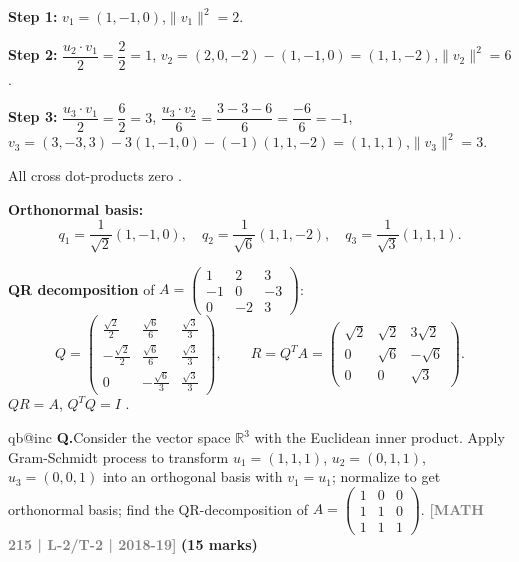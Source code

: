 \documentclass[12pt,a3paper]{article}
\makeatletter
\newcommand{\yr}[1]{\hfill\textcolor{gray}{\small\textbf{[#1]}}}
\newcommand{\mk}[1]{\textcolor{orange!70!black}{\small\textbf{(#1 marks)}}}
\newcounter{qnum}
\newcommand{\Q}[1]{%
  \csname qb@inc\endcsname
  \needspace{4\baselineskip}
  \refstepcounter{qnum}
  \vspace{6pt}
  \noindent\textbf{Q\theqnum.}\enspace #1\par
}
\makeatother
\begin{document}
\begin{tcolorbox}[enhanced,breakable,
  colback=cD!4,colframe=cD,boxrule=0.8pt,arc=5pt,
  title={\textbf{Answer --- Gram-Schmidt \& QR: $u_1\!=\!(1,-1,0)$, $u_2\!=\!(2,0,-2)$, $u_3\!=\!(3,-3,3)$}},
  fonttitle=\bfseries\color{white},colbacktitle=cD]

\textbf{Step 1:} $v_1=(1,-1,0)$,\quad $\|v_1\|^2=2$.

\textbf{Step 2:} $\dfrac{u_2\cdot v_1}{2}=\dfrac{2}{2}=1$,\quad
$v_2=(2,0,-2)-(1,-1,0)=(1,1,-2)$,\quad $\|v_2\|^2=6$.

\textbf{Step 3:} $\dfrac{u_3\cdot v_1}{2}=\dfrac{6}{2}=3$,\;
$\dfrac{u_3\cdot v_2}{6}=\dfrac{3-3-6}{6}=\dfrac{-6}{6}=-1$,\quad
$v_3=(3,-3,3)-3(1,-1,0)-(-1)(1,1,-2)=(1,1,1)$,\quad $\|v_3\|^2=3$.

All cross dot-products zero . \checkmark

\textbf{Orthonormal basis:}
\[
q_1=\frac{1}{\sqrt{2}}(1,-1,0),\quad
q_2=\frac{1}{\sqrt{6}}(1,1,-2),\quad
q_3=\frac{1}{\sqrt{3}}(1,1,1).
\]

\textbf{QR decomposition} of $A=\begin{pmatrix}1&2&3\\-1&0&-3\\0&-2&3\end{pmatrix}$:
\[
Q=\begin{pmatrix}
\frac{\sqrt{2}}{2}&\frac{\sqrt{6}}{6}&\frac{\sqrt{3}}{3}\\[4pt]
-\frac{\sqrt{2}}{2}&\frac{\sqrt{6}}{6}&\frac{\sqrt{3}}{3}\\[4pt]
0&-\frac{\sqrt{6}}{3}&\frac{\sqrt{3}}{3}
\end{pmatrix},\qquad
R=Q^TA=\begin{pmatrix}\sqrt{2}&\sqrt{2}&3\sqrt{2}\\0&\sqrt{6}&-\sqrt{6}\\0&0&\sqrt{3}\end{pmatrix}.
\]
$QR=A$, $Q^TQ=I$ . \checkmark

\end{tcolorbox}


\Q{Consider the vector space $\mathbb{R}^3$ with the Euclidean inner product. Apply Gram-Schmidt process to transform $u_1 = (1,1,1)$, $u_2 = (0,1,1)$, $u_3 = (0,0,1)$ into an orthogonal basis with $v_1 = u_1$; normalize to get orthonormal basis; find the QR-decomposition of $A = \begin{pmatrix} 1 & 0 & 0 \\ 1 & 1 & 0 \\ 1 & 1 & 1 \end{pmatrix}$.
\yr{MATH 215 | L-2/T-2 | 2018-19} \mk{15}}
\end{document}
